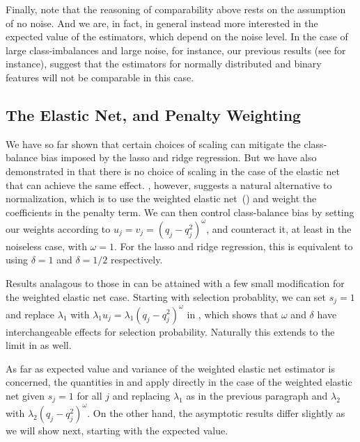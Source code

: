 Finally, note that the reasoning of comparability above rests on the assumption of no
noise. And we are, in fact, in general instead more interested in the expected value of the
estimators, which depend on the noise level. In the case of large class-imbalances and
large noise, for instance, our previous results (see  for
instance), suggest that the estimators for normally distributed and binary features will
not be comparable in this case.


\subsection{The Elastic Net, and Penalty Weighting}\label{sec:binary-weighting}

We have so far shown that certain choices of scaling can mitigate the class-balance bias
imposed by the lasso and ridge regression. But we have also demonstrated in
 that there is no choice of scaling in the case of the
elastic net that can achieve the same effect. , however,
suggests a natural alternative to normalization, which is to use the weighted elastic
net~() and weight the coefficients in the penalty term. We
can then control class-balance bias by setting our weights according to \(u_j = v_j = (q_j
- q_j^2)^{\omega}\), and counteract it, at least in the noiseless case, with \(\omega =
1\). For the lasso and ridge regression, this is equivalent to using \(\delta = 1\) and
\(\delta = 1/2\) respectively.

Results analagous to those in  can be attained with a few
small modification for the weighted elastic net case. Starting with selection probablity,
we can set \(s_j = 1\) and replace \(\lambda_1\) with \(\lambda_1 u_j =
\lambda_1(q_j-q_j^2)^\omega\) in , which shows that
\(\omega\) and \(\delta\) have interchangeable effects for selection probability. Naturally
this extends to the limit in  as well.

As far as expected value and variance of the weighted elastic net estimator is concerned,
the quantities in  and  apply
directly in the case of the weighted elastic net given \(s_j = 1\) for all \(j\) and
replacing \(\lambda_1\) as in the previous paragraph and \(\lambda_2\) with \(\lambda_2
(q_j - q_j^2)^\omega\). On the other hand, the asymptotic results differ slightly as we
will show next, starting with the expected value.


